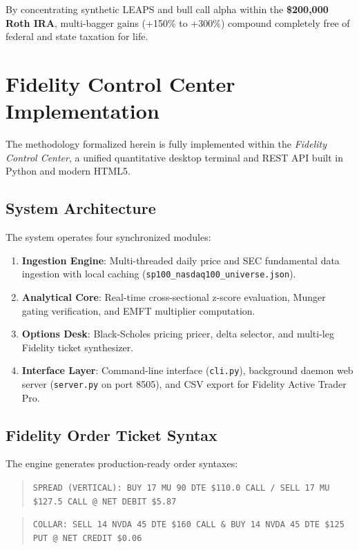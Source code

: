 \documentclass[11pt]{article}
\begin{document}
By concentrating synthetic LEAPS and bull call alpha within the \textbf{\$200,000 Roth IRA}, multi-bagger gains (+150\% to +300\%) compound completely free of federal and state taxation for life.

\section{Fidelity Control Center Implementation}

The methodology formalized herein is fully implemented within the \textit{Fidelity Control Center}, a unified quantitative desktop terminal and REST API built in Python and modern HTML5.

\subsection{System Architecture}
The system operates four synchronized modules:
\begin{enumerate}
    \item \textbf{Ingestion Engine}: Multi-threaded daily price and SEC fundamental data ingestion with local caching (\texttt{sp100\_nasdaq100\_universe.json}).
    \item \textbf{Analytical Core}: Real-time cross-sectional z-score evaluation, Munger gating verification, and EMFT multiplier computation.
    \item \textbf{Options Desk}: Black-Scholes pricing pricer, delta selector, and multi-leg Fidelity ticket synthesizer.
    \item \textbf{Interface Layer}: Command-line interface (\texttt{cli.py}), background daemon web server (\texttt{server.py} on port 8505), and CSV export for Fidelity Active Trader Pro.
\end{enumerate}

\subsection{Fidelity Order Ticket Syntax}
The engine generates production-ready order syntaxes:
\begin{quote}
\small\texttt{SPREAD (VERTICAL): BUY 17 MU 90 DTE \$110.0 CALL / SELL 17 MU \$127.5 CALL @ NET DEBIT \$5.87}
\end{quote}
\begin{quote}
\small\texttt{COLLAR: SELL 14 NVDA 45 DTE \$160 CALL \& BUY 14 NVDA 45 DTE \$125 PUT @ NET CREDIT \$0.06}
\end{quote}
\end{document}
